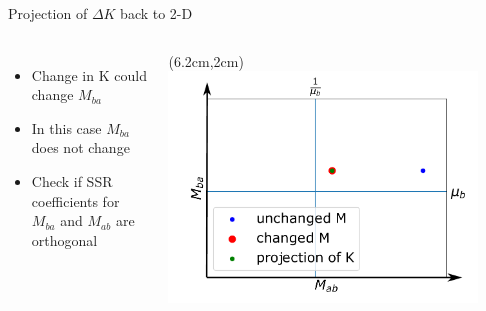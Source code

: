 \documentclass[15pt]{beamer}
\begin{document}
\begin{frame}{Projection of $\Delta K$ back to 2-D}
\begin{columns}
\begin{itemize}
	\item Change in K could change $M_{ba}$
	\item In this case $M_{ba}$ does not change
	\item Check if SSR coefficients for $M_{ba}$ and $M_{ab}$ are orthogonal
\end{itemize}
 
	\begin{textblock*}{7.3cm}(6.2cm,2cm) %
	 \includegraphics[width=0.9\textwidth]{projection_delta_K}\\[-1ex]
	 {\tiny }
	\end{textblock*}
\end{columns}
\end{frame}
\end{document}
